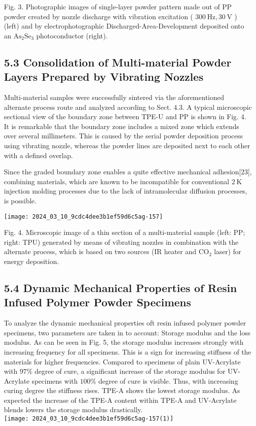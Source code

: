 \documentclass[10pt]{article}
\begin{document}
Fig. 3. Photographic images of single-layer powder pattern made out of PP powder created by nozzle discharge with vibration excitation ( $300 \mathrm{~Hz}, 30 \mathrm{~V}$ ) (left) and by electrophotographic Discharged-Area-Development deposited onto an $\mathrm{As}_{2} \mathrm{Se}_{3}$ photoconductor (right).

\subsection*{5.3 Consolidation of Multi-material Powder Layers Prepared by Vibrating Nozzles}
Multi-material samples were successfully sintered via the aforementioned alternate process route and analyzed according to Sect. 4.3. A typical microscopic sectional view of the boundary zone between TPE-U and PP is shown in Fig. 4. It is remarkable that the boundary zone includes a mixed zone which extends over several millimeters. This is caused by the serial powder deposition process using vibrating nozzle, whereas the powder lines are deposited next to each other with a defined overlap.

Since the graded boundary zone enables a quite effective mechanical adhesion[23], combining materials, which are known to be incompatible for conventional $2 \mathrm{~K}$ injection molding processes due to the lack of intramolecular diffusion processes, is possible.

\begin{center}
\texttt{[image: 2024\_03\_10\_9cdc4dee3b1ef59d6c5ag-157]}
\end{center}

Fig. 4. Microscopic image of a thin section of a multi-material sample (left: PP; right: TPU) generated by means of vibrating nozzles in combination with the alternate process, which is based on two sources (IR heater and $\mathrm{CO}_{2}$ laser) for energy deposition.

\subsection*{5.4 Dynamic Mechanical Properties of Resin Infused Polymer Powder Specimens}
To analyze the dynamic mechanical properties oft resin infused polymer powder specimens, two parameters are taken in to account: Storage modulus and the loss modulus. As can be seen in Fig. 5, the storage modulus increases strongly with increasing frequency for all specimens. This is a sign for increasing stiffness of the materials for higher frequencies. Compared to specimens of plain UV-Acrylate with $97 \%$ degree of cure, a significant increase of the storage modulus for UV-Acrylate specimens with $100 \%$ degree of cure is visible. Thus, with increasing curing degree the stiffness rises. TPE-A shows the lowest storage modulus. As expected the increase of the TPE-A content within TPE-A and UV-Acrylate blends lowers the storage modulus drastically.\\
\texttt{[image: 2024\_03\_10\_9cdc4dee3b1ef59d6c5ag-157(1)]}
\end{document}
